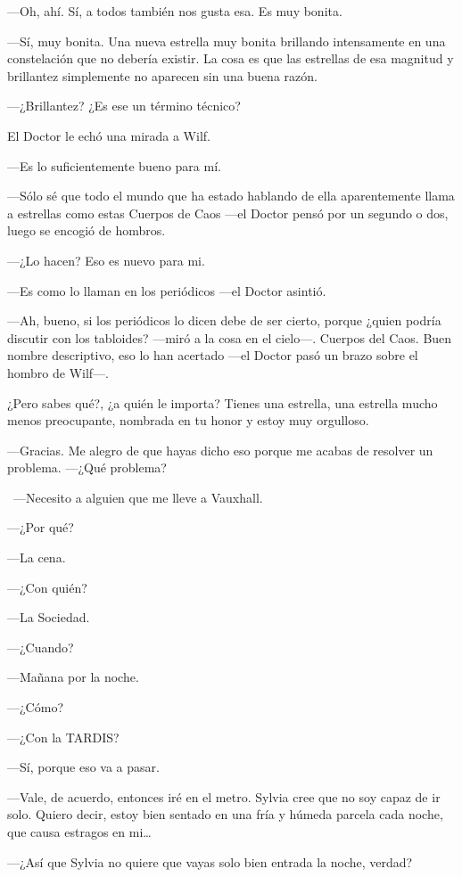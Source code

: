 ---Oh, ahí. Sí, a todos también nos gusta esa. Es muy bonita.

---Sí, muy bonita. Una nueva estrella muy bonita brillando intensamente
en una constelación que no debería existir. La cosa es que las estrellas
de esa magnitud y brillantez simplemente no aparecen sin una buena
razón.

---¿Brillantez? ¿Es ese un término técnico?

El Doctor le echó una mirada a Wilf.

---Es lo suficientemente bueno para mí.

---Sólo sé que todo el mundo que ha estado hablando de ella
aparentemente llama a estrellas como estas Cuerpos de Caos ---el Doctor
pensó por un segundo o dos, luego se encogió de hombros.

---¿Lo hacen? Eso es nuevo para mi.

---Es como lo llaman en los periódicos ---el Doctor asintió.

---Ah, bueno, si los periódicos lo dicen debe de ser cierto, porque
¿quien podría discutir con los tabloides? ---miró a la cosa en el
cielo---. Cuerpos del Caos. Buen nombre descriptivo, eso lo han acertado
---el Doctor pasó un brazo sobre el hombro de Wilf---.

¿Pero sabes qué?, ¿a quién le importa? Tienes una estrella, una
estrella mucho menos preocupante, nombrada en tu honor y estoy muy
orgulloso.

---Gracias. Me alegro de que hayas dicho eso porque me acabas de
resolver un problema. ---¿Qué problema?

~---Necesito a alguien que me lleve a Vauxhall.

---¿Por qué?

---La cena.

---¿Con quién?

---La Sociedad.

---¿Cuando?

---Mañana por la noche.

---¿Cómo?

---¿Con la TARDIS?

---Sí, porque eso va a pasar.

---Vale, de acuerdo, entonces iré en el metro. Sylvia cree que no soy
capaz de ir solo. Quiero decir, estoy bien sentado en una fría y húmeda
parcela cada noche, que causa estragos en mi\ldots{}

---¿Así que Sylvia no quiere que vayas solo bien entrada la noche,
verdad?

